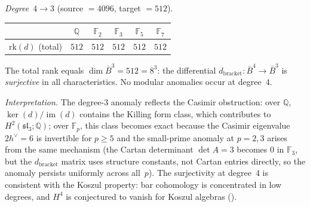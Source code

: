 \begin{computation}
\emph{Degree~$4 \to 3$} (source $= 4096$, target $= 512$).
\begin{center}
\renewcommand{\arraystretch}{1.2}
\begin{tabular}{c|ccccc}
& $\mathbb{Q}$ & $\mathbb{F}_2$ & $\mathbb{F}_3$ &
$\mathbb{F}_5$ & $\mathbb{F}_7$ \\
\hline
$\mathrm{rk}(d)$ (total) & $512$ & $512$ & $512$ & $512$ & $512$
\end{tabular}
\end{center}
The total rank equals $\dim \bar{B}^3 = 512 = 8^3$: the differential
$d_{\mathrm{bracket}}\colon \bar{B}^4 \to \bar{B}^3$ is
\emph{surjective} in all characteristics.  No modular anomalies
occur at degree~$4$.

\emph{Interpretation.}  The degree-$3$ anomaly reflects the
Casimir obstruction: over $\mathbb{Q}$,
$\ker(d)/\operatorname{im}(d)$ contains the Killing form class,
which contributes to $H^2(\mathfrak{sl}_3; \mathbb{Q})$; over
$\mathbb{F}_p$, this class becomes exact because the Casimir
eigenvalue $2h^\vee = 6$ is invertible for $p \geq 5$ and
the small-prime anomaly at $p = 2, 3$ arises from the same
mechanism (the Cartan determinant
$\det A = 3$ becomes $0$ in $\mathbb{F}_3$, but
the $d_{\mathrm{bracket}}$ matrix uses structure constants,
not Cartan entries directly, so the anomaly persists
uniformly across all~$p$).
The surjectivity at degree~$4$ is consistent with the
Koszul property: bar cohomology is concentrated in low degrees,
and $H^4$ is conjectured to vanish for Koszul algebras
(\ClaimStatusConjectured).
\end{computation}


